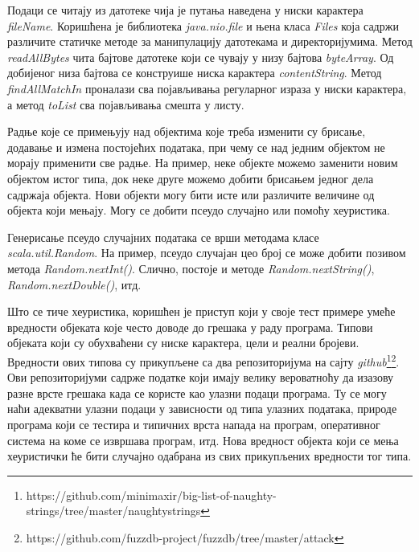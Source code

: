 \documentclass[12pt,oneside]{memoir}
\begin{document}
Подаци се читају из датотеке чија је путања наведена у ниски карактера \textit{fileName}. Коришћена је библиотека \textit{java.nio.file} и њена класа \textit{Files} која садржи различите статичке методе за манипулацију датотекама и директоријумима. Метод \textit{readAllBytes} чита бајтове датотеке који се чувају у низу бајтова \textit{byteArray}. Од добијеног низа бајтова се конструише ниска карактера \textit{contentString}. Метод \textit{findAllMatchIn} проналази сва појављивања регуларног израза у ниски карактера, а метод \textit{toList} сва појављивања смешта у листу.

Радње које се примењују над објектима које треба изменити су брисање, додавање и измена постојећих података, при чему се над једним објектом не морају применити све радње. На пример, неке објекте можемо заменити новим објектом истог типа, док неке друге можемо добити брисањем једног дела садржаја објекта. Нови објекти могу бити исте или различите величине од објекта који мењају. Могу се  добити псеудо случајно или помоћу хеуристика. 

Генерисање псеудо случајних података се врши методама класе \textit{scala.util.Random}. На пример, псеудо случајан цео број се може добити позивом метода \textit{Random.nextInt()}. Слично, постоје и методе \textit{Random.nextString()}, \textit{Random.nextDouble()}, итд. 

Што се тиче хеуристика, коришћен је приступ који у своје тест примере умеће вредности објеката које често доводе до грешака у раду програма. Типови објеката који су обухваћени су ниске карактера, цели и реални бројеви. Вредности ових типова су прикупљене са два репозиторијума на сајту \textit{github}\footnote{https://github.com/minimaxir/big-list-of-naughty-strings/tree/master/naughtystrings}\footnote{https://github.com/fuzzdb-project/fuzzdb/tree/master/attack}. Ови репозиторијуми садрже податке који имају велику вероватноћу да изазову разне врсте грешака када се користе као улазни подаци програма. Ту се могу наћи адекватни улазни подаци у зависности од типа улазних података, природе програма који се тестира и типичних врста напада на програм, оперативног система на коме се извршава програм, итд. Нова вредност објекта који се мења хеуристички ће бити случајно одабрана из свих прикупљених вредности тог типа.
\end{document}
